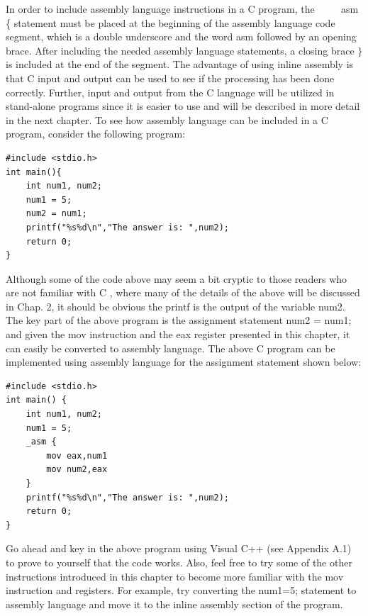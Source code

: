 \documentclass[10pt]{book}
\begin{document}
In order to include assembly language instructions in a C program, the $\qquad$ asm \{ statement must be placed at the beginning of the assembly language code segment, which is a double underscore and the word asm followed by an opening brace. After including the needed assembly language statements, a closing brace $\}$ is included at the end of the segment. The advantage of using inline assembly is that C input and output can be used to see if the processing has been done correctly. Further, input and output from the C language will be utilized in stand-alone programs since it is easier to use and will be described in more detail in the next chapter.
To see how assembly language can be included in a C program, consider the following program:

\begin{verbatim}
#include <stdio.h>
int main(){
    int num1, num2;
    num1 = 5;
    num2 = num1;
    printf("%s%d\n","The answer is: ",num2);
    return 0;
}
\end{verbatim}

Although some of the code above may seem a bit cryptic to those readers who are not familiar with C , where many of the details of the above will be discussed in Chap. 2, it should be obvious the printf is the output of the variable num2. The key part of the above program is the assignment statement num2 = num1; and given the mov instruction and the eax register presented in this chapter, it can easily be converted to assembly language. The above C program can be implemented using assembly language for the assignment statement shown below:

\begin{verbatim}
#include <stdio.h>
int main() {
    int num1, num2;
    num1 = 5;
    _asm {
        mov eax,num1
        mov num2,eax
    }
    printf("%s%d\n","The answer is: ",num2);
    return 0;
}
\end{verbatim}

Go ahead and key in the above program using Visual C++ (see Appendix A.1) to prove to yourself that the code works. Also, feel free to try some of the other instructions introduced in this chapter to become more familiar with the mov instruction and registers. For example, try converting the num1=5; statement to assembly language and move it to the inline assembly section of the program.
\end{document}
